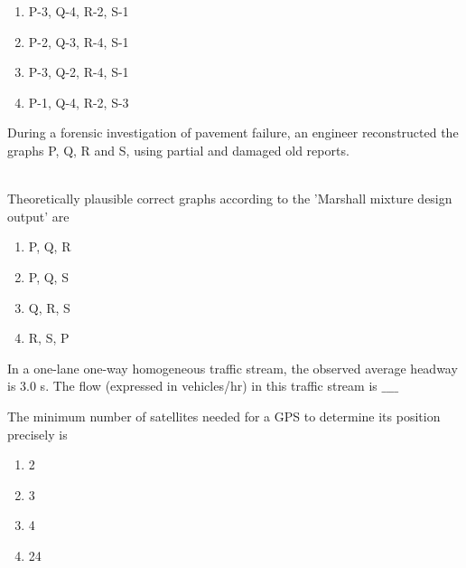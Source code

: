 \begin{enumerate}
    \item P-3, Q-4, R-2, S-1 
    \item P-2, Q-3, R-4, S-1
    \item P-3, Q-2, R-4, S-1 
    \item P-1, Q-4, R-2, S-3 \\
\end{enumerate}
\item During a forensic investigation of pavement failure, an engineer reconstructed the graphs P, Q, R and S, using partial and damaged old reports.
\begin{figure}[!ht]
\centering
\resizebox{0.25\textwidth}{!}{%

}%
\end{figure}
\begin{figure}[!ht]
\centering
\resizebox{0.25\textwidth}{!}{%

}%
\end{figure}
\begin{figure}[!ht]
\centering
\resizebox{0.25\textwidth}{!}{%

}%
\end{figure}
\begin{figure}[!ht]
\centering
\resizebox{0.25\textwidth}{!}{%

}%
\end{figure}
\\
Theoretically plausible correct graphs according to the 'Marshall mixture design output' are
\begin{enumerate}
    \item P, Q, R 
    \item P, Q, S 
    \item Q, R, S 
    \item R, S, P \\
\end{enumerate}
\item In a one-lane one-way homogeneous traffic stream, the observed average headway is 3.0 s. The flow (expressed in vehicles/hr) in this traffic stream is
 $\_\_\_\_$ \\
\item The minimum number of satellites needed for a GPS to determine its position precisely is 
\begin{enumerate}
    \item 2
    \item 3
    \item 4
    \item 24 \\
\end{enumerate}
